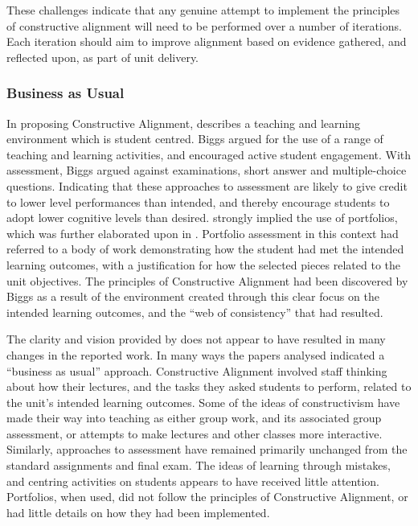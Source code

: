 These challenges indicate that any genuine attempt to implement the principles of constructive alignment will need to be performed over a number of iterations. Each iteration should aim to improve alignment based on evidence gathered, and reflected upon, as part of unit delivery.


\subsubsection{Business as Usual} %
\label{ssub:business_as_usual}

In proposing Constructive Alignment, \citet{Biggs:1996c} describes a teaching and learning environment which is student centred. Biggs argued for the use of a range of teaching and learning activities, and encouraged active student engagement. With assessment, Biggs argued against examinations, short answer and multiple-choice questions. Indicating that these approaches to assessment are likely to give credit to lower level performances than intended, and thereby encourage students to adopt lower cognitive levels than desired. \citet{Biggs:1996c} strongly implied the use of portfolios, which was further elaborated upon in \citet{Biggs:1997}. Portfolio assessment in this context had referred to a body of work demonstrating how the student had met the intended learning outcomes, with a justification for how the selected pieces related to the unit objectives. The principles of Constructive Alignment had been discovered by Biggs as a result of the environment created through this clear focus on the intended learning outcomes, and the ``web of consistency'' that had resulted.

The clarity and vision provided by \citet{Biggs:1996c} does not appear to have resulted in many changes in the reported work. In many ways the papers analysed indicated a ``business as usual'' approach. Constructive Alignment involved staff thinking about how their lectures, and the tasks they asked students to perform, related to the unit's intended learning outcomes. Some of the ideas of constructivism have made their way into teaching as either group work, and its associated group assessment, or attempts to make lectures and other classes more interactive. Similarly, approaches to assessment have remained primarily unchanged from the standard assignments and final exam. The ideas of learning through mistakes, and centring activities on students appears to have received little attention. Portfolios, when used, did not follow the principles of Constructive Alignment, or had little details on how they had been implemented. 


